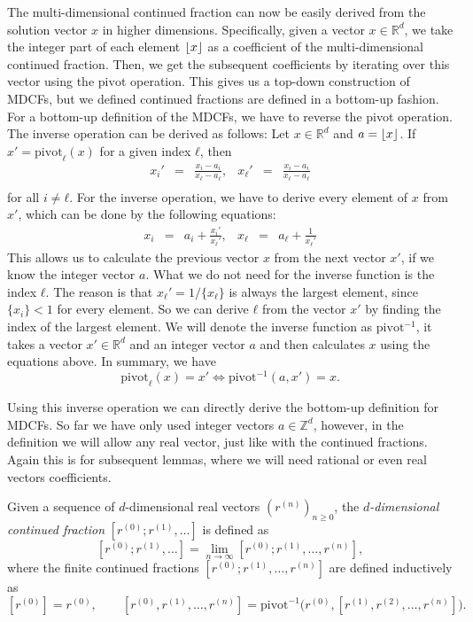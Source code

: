 The multi-dimensional continued fraction can now be easily derived from the
solution vector $x$ in higher dimensions.
Specifically, given a vector $x ∈ ℝ^d$, we take the integer part of each
element $\left\lfloor x\right\rfloor$ as a coefficient of the multi-dimensional continued
fraction.
Then, we get the subsequent coefficients by iterating over this vector using
the $\mathrm{pivot}$ operation.
This gives us a top-down construction of MDCFs, but we defined continued
fractions are defined in a bottom-up fashion.
For a bottom-up definition of the MDCFs, we have to reverse the pivot operation.
The inverse operation can be derived as follows:
Let $x ∈ ℝ^d$ and $a = \left\lfloor x\right\rfloor$.
If $x' = \mathrm{pivot}_ℓ(x)$ for a given index $ℓ$, then
\[
  \begin{array}{lcrlcr}
    \displaystyle x_i' & = & \displaystyle \frac{x_i - a_i}{x_ℓ - a_ℓ}, &
    \displaystyle x_ℓ' & = & \displaystyle \frac{x_i - a_i}{x_ℓ - a_ℓ} \\[1em]
  \end{array}
\]
for all $i ≠ ℓ$.
For the inverse operation, we have to derive every element of $x$ from $x'$,
which can be done by the following equations:
\[
  \begin{array}{lcrlcr}
    \displaystyle x_i & = & a_i + \displaystyle \frac{x_i'}{x_ℓ'}, &
    \displaystyle x_ℓ & = & a_ℓ + \displaystyle \frac{1}{x_ℓ'}
  \end{array}
\]
This allows us to calculate the previous vector $x$ from the next vector $x'$,
if we know the integer vector $a$.
What we do not need for the inverse function is the index $ℓ$.
The reason is that $x_ℓ' = 1/\{x_ℓ\}$ is always the largest element,
since $\{x_i\} < 1$ for every element.
So we can derive $ℓ$ from the vector $x'$ by finding the index of the largest element.
We will denote the inverse function as $\mathrm{pivot}^{-1}$,
it takes a vector $x' ∈ ℝ^d$ and an integer vector $a$
and then calculates $x$ using the equations above.
In summary, we have
\[
  \mathrm{pivot}_ℓ(x) = x' \iff \mathrm{pivot}^{-1}(a, x') = x.
\]

Using this inverse operation we can directly derive the bottom-up definition for MDCFs.
So far we have only used integer vectors $a ∈ ℤ^d$,
however, in the definition we will allow any real vector, just like with the continued fractions.
Again this is for subsequent lemmas, where we will need rational or even real vectors coefficients.

\begin{definition}
  Given a sequence of $d$-dimensional real vectors $(r^{(n)})_{n ≥ 0}$,
  the \emph{$d$-dimensional continued fraction} $[r^{(0)}; r^{(1)}, …]$ is defined as
  \[
    [r^{(0)}; r^{(1)}, …] = \lim_{n → ∞} [r^{(0)}; r^{(1)}, …, r^{(n)}],
  \]
  where the finite continued fractions $[r^{(0)}; r^{(1)}, …, r^{(n)}]$
  are defined inductively as
  \[
    [r^{(0)}] = r^{(0)},
    \qquad
    [r^{(0)}, r^{(1)}, …, r^{(n)}]
    = \mathrm{pivot}^{-1}\big(r^{(0)}, [r^{(1)}, r^{(2)}, …, r^{(n)}]\big).
  \]
\end{definition}


